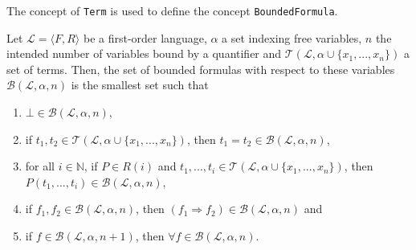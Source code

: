 The concept of \texttt{Term} is used to define the concept \texttt{BoundedFormula}.

\begin{definition}[BoundedFormula]\label{def:bf}
    \leanok
    Let $\mathcal{L} = \langle F, R \rangle$ be a first-order language, $\alpha$ a set indexing free variables, $n$ the intended number of variables bound by a quantifier and $\mathcal{T}(\mathcal{L}, \alpha \cup \{x_1,...,x_n\})$ a set of terms. Then, the set of bounded formulas with respect to these variables $\mathcal{B}(\mathcal{L},\alpha,n)$ is the smallest set such that
    \begin{enumerate}
        \item $\bot \in \mathcal{B}(\mathcal{L},\alpha,n)$,
        \item if $t_1,t_2 \in \mathcal{T}(\mathcal{L}, \alpha \cup \{x_1,...,x_n\})$, then $t_1 = t_2 \in \mathcal{B}(\mathcal{L},\alpha,n)$,
        \item for all $i \in \mathbb{N}$, if $P \in R(i)$ and $t_1,...,t_i \in \mathcal{T}(\mathcal{L}, \alpha \cup \{x_1,...,x_n\})$, then $P(t_1,...,t_i) \in \mathcal{B}(\mathcal{L},\alpha,n)$,
        \item if $f_1,f_2 \in \mathcal{B}(\mathcal{L},\alpha,n)$, then $(f_1 \Rightarrow f_2) \in \mathcal{B}(\mathcal{L},\alpha,n)$ and
        \item if $f \in \mathcal{B}(\mathcal{L},\alpha,n+1)$, then $\forall f \in \mathcal{B}(\mathcal{L},\alpha,n)$.
    \end{enumerate}
\end{definition}

